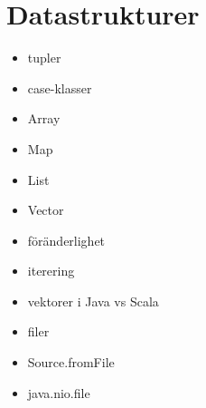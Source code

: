 \chapter{Datastrukturer}
\begin{itemize}[nosep]
\item tupler
\item case-klasser
\item Array
\item Map
\item List
\item Vector
\item föränderlighet
\item iterering
\item vektorer i Java vs Scala
\item filer
\item Source.fromFile
\item java.nio.file\end{itemize}